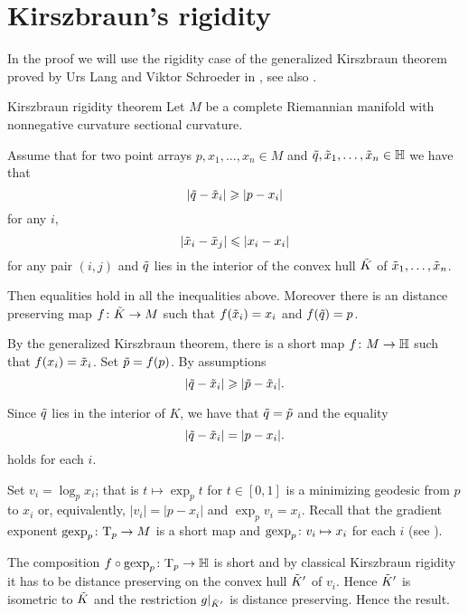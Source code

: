 \section{Kirszbraun's rigidity}

In the proof we will use the rigidity case of the generalized Kirszbraun theorem proved by Urs Lang and Viktor Schroeder in \cite{LS}, see also \cite{AKP}.

\begin{thm}{Kirszbraun rigidity theorem}\label{thm:kirszbraun-rigid}
Let $M$ be a complete Riemannian manifold with nonnegative curvature sectional curvature.

Assume that for two point arrays $p,x_1,\dots,x_n\in M$ and $\~q, \~x_1,\dots,\~x_n\in \HH$ we have that 
\[|\~q-\~x_i|\ge |p-x_i|\]
for any $i$,
\[|\~x_i-\~x_j|\le |x_i-x_i|\]
for any pair $(i,j)$
and $\~q$ lies in the interior of the convex hull $\~K$ of $\~x_1,\dots,\~x_n$.

Then equalities hold in all the inequalities above.
Moreover there is an distance preserving map $f\:\~K\to M$ such that $f(\~x_i)=x_i$ and $f(\~q)=p$. 
\end{thm}

By the generalized Kirszbraun theorem, there is a short map $f\:M\to \HH$
such that $f(x_i)=\~x_i$.
Set  $\~p=f(p)$.
By assumptions
\[|\~q-\~x_i|\ge |\~p-\~x_i|.\]

Since $\~q$ lies in the interior of $K$, we have that $\~q=\~p$ and the equality 
\[|\~q-\~x_i|= |p-x_i|.\]
holds for each $i$.

Set $v_i=\log_px_i$; that is $t\mapsto \exp_pt$ for $t\in[0,1]$ is a minimizing geodesic from $p$ to $x_i$ or, equivalently, $|v_i|=|p-x_i|$ and $\exp_pv_i=x_i$.
Recall that the gradient exponent $\gexp_p\:\T_p\to M$
is a short map and $\gexp_p\:v_i\mapsto x_i$ for each $i$ (see \cite{AKP}).


The composition $f\circ \gexp_p\:\T_p\to \HH$ is short
and by classical Kirszbraun rigidity it has to be distance preserving on the convex hull $\~K'$ of $v_i$.
Hence $\~K'$ is isometric to $\~K$ and the restriction $g|_{\~K'}$ is distance preserving. 
Hence the result.
\qeds
